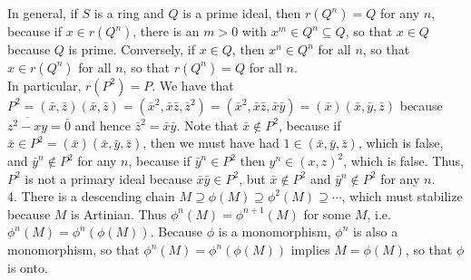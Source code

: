\documentclass[11pt]{article}
\begin{document}
In general, if $S$ is a ring and $Q$ is a prime ideal, then $r(Q^n)=Q$ for any
$n$, because if $x\in r(Q^n)$, there is an $m>0$ with $x^m\in Q^n\subseteq Q$,
so that $x\in Q$ because $Q$ is prime. Conversely, if $x\in Q$, then $x^n\in
Q^n$ for all $n$, so that $x\in r(Q^n)$ for all $n$, so that $r(Q^n)=Q$
for all $n$.\\

In particular, $r(P^2)=P$. We have that
$P^2=(\bar{x},\bar{z})(\bar{x},\bar{z})=(\bar{x}^2,\bar{x}\bar{z},\bar{z}^2)=(\bar{x}^2,\bar{x}\bar{z},\bar{x}\bar{y})=(\bar{x})(\bar{x},\bar{y},\bar{z})$
because $\overline{z^2-xy}=\bar{0}$ and hence
$\bar{z}^2=\bar{x}\bar{y}$. Note that $\bar{x}\notin P^2$, because if
$\bar{x}\in P^2=(\bar{x})(\bar{x},\bar{y},\bar{z})$, then we must have had
$1\in(\bar{x},\bar{y},\bar{z})$, which is false, and $\bar{y}^n\notin P^2$
for any $n$, because if $\bar{y}^n\in P^2$ then $y^n\in (x,z)^2$, which is
false. Thus, $P^2$ is not a primary ideal because $\bar{x}\bar{y}\in P^2$,
but $\bar{x}\notin P^2$ and $\bar{y}^n\notin P^2$ for any $n$.\\

\num{4.} There is a descending chain $M\supseteq
\phi(M)\supseteq\phi^2(M)\supseteq\cdots$, which must stabilize
because $M$ is Artinian. Thus $\phi^n(M)=\phi^{n+1}(M)$ for some $M$,
i.e. $\phi^n(M)=\phi^n(\phi(M))$. Because $\phi$ is a monomorphism, $\phi^n$ is
also a monomorphism, so that $\phi^n(M)=\phi^n(\phi(M))$ implies $M=\phi(M)$,
so that $\phi$ is onto.     \\
\end{document}
